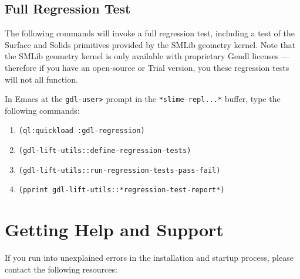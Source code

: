 \documentclass [11pt]{book}
\begin{document}
\subsection{Full Regression Test}

\label{subsec:fullregressiontest}

The following commands will invoke a full regression test, including a test of the Surface and Solids
primitives provided by the SMLib geometry kernel. Note that the SMLib geometry kernel is only available with
proprietary Gendl licenses --- therefore if you have an open-source or Trial version, you these regression
tests will not all function.

In Emacs at the \texttt{gdl-user>} prompt in the \texttt{*slime-repl...*} buffer, type the following commands:

\begin{enumerate}

\item \texttt{(ql:quickload :gdl-regression)}

\item \texttt{(gdl-lift-utils::define-regression-tests)}

\item \texttt{(gdl-lift-utils::run-regression-tests-pass-fail)}

\item \texttt{(pprint gdl-lift-utils::*regression-test-report*)}

\end{enumerate}



\section{Getting Help and Support}

\label{sec:gettinghelpandsupport}

If you run into unexplained errors in the installation and startup process, please contact the following resources:
\end{document}

